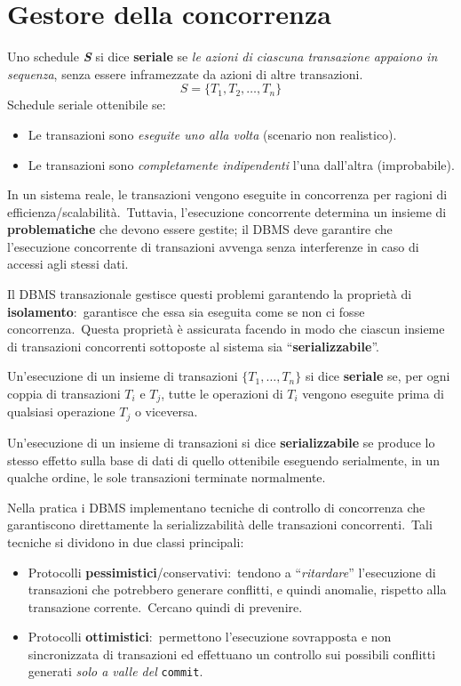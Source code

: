 \section{Gestore della concorrenza}

Uno schedule \textbf{\textit{S}} si dice \textbf{seriale} se \textit{le azioni di ciascuna transazione appaiono in sequenza}, senza essere inframezzate da azioni di altre transazioni.
\[S=\{T_1, T_2,\dots, T_n\}\]
Schedule seriale ottenibile se:
\begin{itemize}
	\item Le transazioni sono \textit{eseguite uno alla volta} (scenario non realistico).
	\item Le transazioni sono \textit{completamente indipendenti} l'una dall'altra (improbabile).
\end{itemize}

\noindent In un sistema reale, le transazioni vengono eseguite in concorrenza per ragioni di efficienza/scalabilità.\
Tuttavia, l'esecuzione concorrente determina un insieme di \textbf{problematiche} che devono essere gestite; il DBMS deve garantire che l'esecuzione concorrente di transazioni avvenga senza interferenze in caso di accessi agli stessi dati.

Il DBMS transazionale gestisce questi problemi garantendo la proprietà di \textbf{isolamento}:\ garantisce che essa sia eseguita come se non ci fosse concorrenza.\
Questa proprietà è assicurata facendo in modo che ciascun insieme di transazioni concorrenti sottoposte al sistema sia ``\textbf{serializzabile}''.

\begin{definition}
	Un'esecuzione di un insieme di transazioni $\{T_1, \dots, T_n\}$ si dice \textbf{seriale} se, per ogni coppia di transazioni $T_i$ e $T_j$, tutte le operazioni di $T_i$ vengono eseguite prima di qualsiasi operazione $T_j$ o viceversa.
\end{definition}

\begin{definition}
	Un'esecuzione di un insieme di transazioni si dice \textbf{serializzabile} se produce lo stesso effetto sulla base di dati di quello ottenibile eseguendo serialmente, in un qualche ordine, le sole transazioni terminate normalmente.
\end{definition}

\noindent Nella pratica i DBMS implementano tecniche di controllo di concorrenza che garantiscono direttamente la serializzabilità delle transazioni concorrenti.\
Tali tecniche si dividono in due classi principali:
\begin{itemize}
	\item Protocolli \textbf{pessimistici}/conservativi:\ tendono a ``\textit{ritardare}'' l'esecuzione di transazioni che potrebbero generare conflitti, e quindi anomalie, rispetto alla transazione corrente.\ Cercano quindi di prevenire.
	\item Protocolli \textbf{ottimistici}:\ permettono l'esecuzione sovrapposta e non sincronizzata di transazioni ed effettuano un controllo sui possibili conflitti generati \textit{solo a valle del} \texttt{commit}.
\end{itemize}

